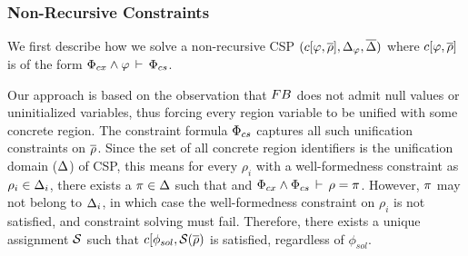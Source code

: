 \subsubsection{Non-Recursive Constraints}
\label{sec:csolve}

We first describe how we solve a non-recursive CSP $(c\lbrack \varphi,\overline{\rho} \rbrack,\Delta_{\varphi},\overline{\Delta})$ where
$c\lbrack \varphi,\overline{\rho} \rbrack$ is of the form $\Phi_{cx}
\wedge \varphi\,\vdash\,\Phi_{cs}$. 

Our approach is based on the observation that ${\sc FB}$ does not admit
null values or uninitialized variables, thus forcing every region
variable to be unified with some concrete region. The constraint
formula $\Phi_{cs}$ captures all such unification constraints on
$\overline{\rho}$. Since the set of all concrete region identifiers is the
unification domain ($\Delta$) of CSP, this means for every $\rho_i$
with a well-formedness constraint as $\rho_i \in \Delta_i$, there
exists a $\pi \in \Delta$ such that and $\Phi_{cx} \wedge
\Phi_{cs}\,\vdash\,\rho = \pi$. However, $\pi$ may not belong to $\Delta_i$,
in which case the well-formedness constraint on $\rho_i$ is not
satisfied, and constraint solving must fail.  Therefore, there exists
a unique assignment $\mathcal{S}$ such that $c\lbrack
\phi_{sol},\mathcal{S}(\overline{\rho})$ is satisfied, regardless of
$\phi_{sol}$.

